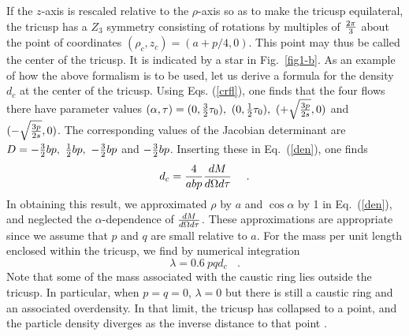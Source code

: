 \documentclass[aps,prd,preprint,tightenlines,floatfix,showpacs,groupedaddress]{revtex4}
\begin{document}
If the $z$-axis is rescaled relative to the $\rho$-axis so 
as to make the tricusp equilateral, the tricusp has a $Z_3$
symmetry \cite{sing} consisting of rotations by multiples of 
${2 \pi \over 3}$ about the point of coordinates
$(\rho_c,z_c) = (a + p/4, 0)$.  This point may thus be called 
the center of the tricusp.  It is indicated by a star in Fig.~\ref{fig1-b}.
As an example of how the above formalism is to be used, let us 
derive a formula for the density $d_c$ at the center of the
tricusp.  Using Eqs. (\ref{crfl}), one finds that the four flows 
there have parameter values $(\alpha, \tau) = 
(0, {3 \over 2} \tau_0),~(0, {1 \over 2} \tau_0),~
(+\sqrt{3p \over 2s}, 0)$ and $(-\sqrt{3p \over 2s}, 0)$.  
The corresponding values of the Jacobian determinant are 
$D = - {3 \over 2} bp,~{1 \over 2} bp,~ - {3 \over 2} bp$ and 
$ - {3 \over 2} bp$.  Inserting these in Eq.~(\ref{den}), one 
finds
\begin{equation}
d_c = {4 \over a b p} {dM \over d\Omega d\tau}~~~\ .
\label{cenden}
\end{equation}
In obtaining this result, we approximated $\rho$ by $a$ and
$\cos \alpha$ by 1 in Eq.~(\ref{den}), and neglected the
$\alpha$-dependence of ${dM \over d\Omega d\tau}$.  These 
approximations are appropriate since we assume that $p$ and 
$q$ are small relative to $a$.  For the mass per unit length 
enclosed within the tricusp, we find by numerical integration
\begin{equation}
\lambda = 0.6~ p q d_c~~~\ .
\label{mol}
\end{equation}
Note that some of the mass associated with the caustic ring lies 
outside the tricusp.  In particular, when $p = q = 0$, $\lambda = 0$ 
but there is still a caustic ring and an associated overdensity.  In 
that limit, the tricusp has collapsed to a point, and the particle 
density diverges as the inverse distance to that point \cite{sing}.
\end{document}
